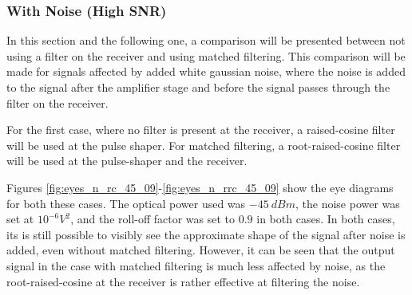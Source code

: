 \begin{refsection}
\subsubsection{With Noise (High SNR)}

In this section and the following one, a comparison will be presented between
not using a filter on the receiver and using matched filtering. This comparison
will be made for signals affected by added white gaussian noise, where the
noise is added to the signal after the amplifier stage and before the signal
passes through the filter on the receiver.

For the first case, where no filter is present at the receiver, a
raised-cosine filter will be used at the pulse shaper. For matched filtering, a
root-raised-cosine filter will be used at the pulse-shaper and the receiver.

Figures \ref{fig:eyes_n_rc_45_09}-\ref{fig:eyes_n_rrc_45_09} show the eye
diagrams for both these cases. The optical power used was $-45~dBm$, the
noise power was set at $10^{-6} V^2$, and the roll-off factor was set
to $0.9$ in both cases. In both cases, its is still possible to visibly see the
approximate shape of the signal after noise is added, even without matched
filtering. However, it can be seen that the output signal in the case with
matched filtering is much less affected by noise, as the root-raised-cosine at
the receiver is rather effective at filtering the noise.

\begin{table}[H]
	\centering
	

\end{table}
\end{refsection}
